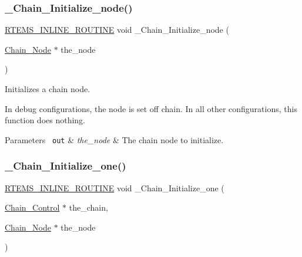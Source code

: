 \subsubsection{\texorpdfstring{\_Chain\_Initialize\_node()}{\_Chain\_Initialize\_node()}}
{\footnotesize\ttfamily \mbox{\hyperlink{group__RTEMSScoreBaseDefs_gac216239df231d5dbd15e3520b0b9313f}{R\+T\+E\+M\+S\+\_\+\+I\+N\+L\+I\+N\+E\+\_\+\+R\+O\+U\+T\+I\+NE}} void \+\_\+\+Chain\+\_\+\+Initialize\+\_\+node (\begin{DoxyParamCaption}\item[{\mbox{\hyperlink{group__RTEMSScoreChain_ga0dd4bfcca1ac7f90de2842e447846d3d}{Chain\+\_\+\+Node}} $\ast$}]{the\+\_\+node }\end{DoxyParamCaption})}



Initializes a chain node. 

In debug configurations, the node is set off chain. In all other configurations, this function does nothing.


\begin{DoxyParams}[1]{Parameters}
\mbox{\texttt{ out}}  & {\em the\+\_\+node} & The chain node to initialize. \\
\hline
\end{DoxyParams}
\mbox{\label{group__RTEMSScoreChain_ga0517456a542eb18908e2aab467e358fb}} 
\subsubsection{\texorpdfstring{\_Chain\_Initialize\_one()}{\_Chain\_Initialize\_one()}}
{\footnotesize\ttfamily \mbox{\hyperlink{group__RTEMSScoreBaseDefs_gac216239df231d5dbd15e3520b0b9313f}{R\+T\+E\+M\+S\+\_\+\+I\+N\+L\+I\+N\+E\+\_\+\+R\+O\+U\+T\+I\+NE}} void \+\_\+\+Chain\+\_\+\+Initialize\+\_\+one (\begin{DoxyParamCaption}\item[{\mbox{\hyperlink{unionChain__Control}{Chain\+\_\+\+Control}} $\ast$}]{the\+\_\+chain,  }\item[{\mbox{\hyperlink{group__RTEMSScoreChain_ga0dd4bfcca1ac7f90de2842e447846d3d}{Chain\+\_\+\+Node}} $\ast$}]{the\+\_\+node }\end{DoxyParamCaption})}



